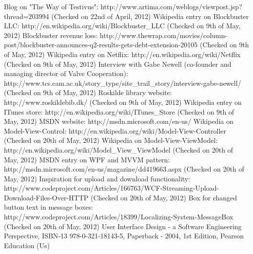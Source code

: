 \begin{thebibliography}{9}
\label{Biblio}
 Blog on "The Way of Testivus": http://www.artima.com/weblogs/viewpost.jsp?thread=203994 (Checked on 22nd of April, 2012)
 Wikipedia entry on Blockbuster LLC: http://en.wikipedia.org/wiki/Blockbuster\_LLC (Checked on 9th of May, 2012)
 Blockbuster revenue loss:  http://www.thewrap.com/movies/column-post/blockbuster-announces-q2-results-gets-debt-extension-20105 (Checked on 9th of May, 2012)
 Wikipedia entry on Netflix: http://en.wikipedia.org/wiki/Netflix (Checked on 9th of May, 2012)
 Interview with Gabe Newell (co-founder and managing director of Valve Cooperation): http://www.tcs.cam.ac.uk/story\_type/site\_trail\_story/interview-gabe-newell/ (Checked on 9th of May, 2012)
 Roskilde library website: http://www.roskildebib.dk/ (Checked on 9th of May, 2012)
 Wikipedia entry on ITunes store: http://en.wikipedia.org/wiki/ITunes\_Store (Checked on 9th of May, 2012)
 MSDN website: http://msdn.microsoft.com/en-us/ 
 Wikipedia on Model-View-Control: http://en.wikipedia.org/wiki/Model-View-Controller (Checked on 20th of May, 2012)
 Wikipedia on Model-View-ViewModel: http://en.wikipedia.org/wiki/Model\_View\_ViewModel (Checked on 20th of May, 2012)
 MSDN entry on WPF and MVVM pattern: http://msdn.microsoft.com/en-us/magazine/dd419663.aspx (Checked on 20th of May, 2012)
 Inspiration for upload and download functionality:  http://www.codeproject.com/Articles/166763/WCF-Streaming-Upload-Download-Files-Over-HTTP (Checked on 20th of May, 2012)
 Box for changed button text in message boxes: http://www.codeproject.com/Articles/18399/Localizing-System-MessageBox (Checked on 20th of May, 2012)
 User Interface Design - a Software Engineering Perspective, ISBN-13 978-0-321-18143-5, Paperback - 2004, 1st Edition, Pearson Education (Us)
\bibitem{}
\bibitem{}
\bibitem{}
\bibitem{}
\bibitem{}
\end{thebibliography}
